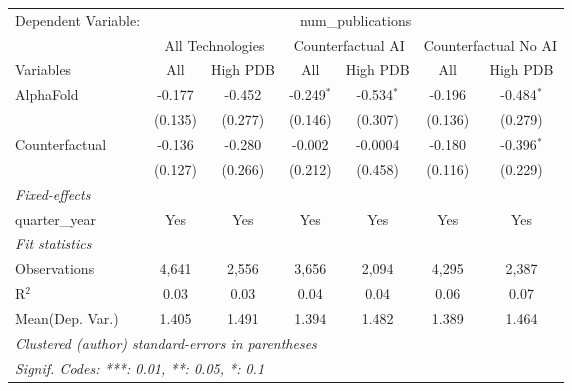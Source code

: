 \begingroup
\centering
\begin{tabular}{lcccccc}
   \tabularnewline \midrule \midrule
   Dependent Variable: & \multicolumn{6}{c}{num\_publications}\\
 & \multicolumn{2}{c}{All Technologies} & \multicolumn{2}{c}{Counterfactual AI} & \multicolumn{2}{c}{Counterfactual No AI} \\
\cmidrule(lr){1-1}\cmidrule(lr){2-3} \cmidrule(lr){4-5} \cmidrule(lr){6-7}
Variables & \multicolumn{1}{c}{All} & \multicolumn{1}{c}{High PDB} & \multicolumn{1}{c}{All} & \multicolumn{1}{c}{High PDB} & \multicolumn{1}{c}{All} & \multicolumn{1}{c}{High PDB} \\
\cmidrule(lr){1-1}\cmidrule(lr){2-2} \cmidrule(lr){3-3} \cmidrule(lr){4-4} \cmidrule(lr){5-5} \cmidrule(lr){6-6} \cmidrule(lr){7-7}
   AlphaFold      & -0.177  & -0.452  & -0.249$^{*}$ & -0.534$^{*}$ & -0.196  & -0.484$^{*}$\\   
                  & (0.135) & (0.277) & (0.146)      & (0.307)      & (0.136) & (0.279)\\   
   Counterfactual & -0.136  & -0.280  & -0.002       & -0.0004      & -0.180  & -0.396$^{*}$\\   
                  & (0.127) & (0.266) & (0.212)      & (0.458)      & (0.116) & (0.229)\\   
   \midrule
   \emph{Fixed-effects}\\
   quarter\_year  & Yes     & Yes     & Yes          & Yes          & Yes     & Yes\\  
   \midrule
   \emph{Fit statistics}\\
   Observations   & 4,641   & 2,556   & 3,656        & 2,094        & 4,295   & 2,387\\  
   R$^2$          & 0.03    & 0.03    & 0.04         & 0.04         & 0.06    & 0.07\\  
Mean(Dep. Var.) & 1.405 & 1.491 & 1.394 & 1.482 & 1.389 & 1.464 \\
   \midrule \midrule
   \multicolumn{7}{l}{\emph{Clustered (author) standard-errors in parentheses}}\\
   \multicolumn{7}{l}{\emph{Signif. Codes: ***: 0.01, **: 0.05, *: 0.1}}\\
\end{tabular}
\par\endgroup
